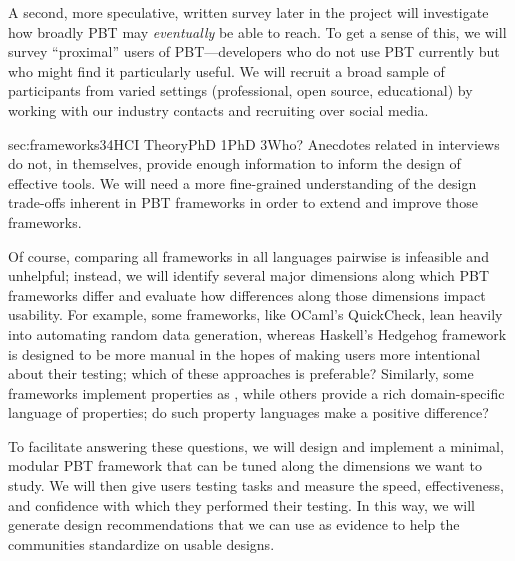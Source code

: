 A second, more speculative, written survey later in the project will investigate
how broadly PBT may {\em eventually} be able to reach.  To get a sense
of this, we will
survey ``proximal'' users of PBT---developers who do not use PBT
currently but who might find it particularly
useful.
We
will recruit a broad sample of participants from varied settings
(professional, open source, educational) by working with our industry contacts
and recruiting over social media.
%
\iflater {} \fi

%
  {sec:frameworks}{3}{4}{HCI Theory}{PhD
1}{PhD 3}{Who?}
%
Anecdotes related in interviews do not, in themselves, provide enough
information to inform the design of effective tools.  We will need a more
fine-grained understanding of the design trade-offs inherent in PBT frameworks
in order to extend and improve those frameworks.

Of course, comparing all frameworks in all languages pairwise is
infeasible and unhelpful; instead, we will identify several major dimensions along which PBT
frameworks differ and evaluate how differences along those dimensions impact
usability. For example, some frameworks, like OCaml's QuickCheck, lean heavily
into automating random data generation, whereas Haskell's Hedgehog framework is designed
to be more manual in the hopes of making users more intentional about their
testing; which of these approaches is preferable? Similarly, some frameworks
implement properties as , while others provide
a rich domain-specific language of properties; do such property
languages make a positive difference?

To facilitate answering these questions, we will design and implement a minimal,
modular PBT framework that can be tuned along the dimensions we want
to study. \iflater{}\fi
We will then give users testing tasks and measure the speed, effectiveness, and
confidence with which they performed their testing. In this way, we will
generate design recommendations that we can use as evidence to help the
communities standardize on usable designs.

